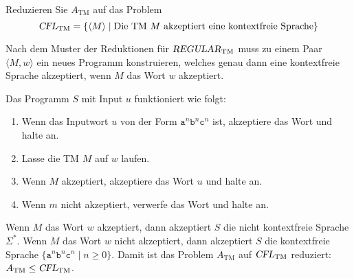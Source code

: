 Reduzieren Sie $A_{\text{TM}}$ auf das Problem
\[
\textsl{CFL}_{\text{TM}}
=
\{
\langle M\rangle
\mid
\text{Die TM $M$ akzeptiert eine kontextfreie Sprache}
\}
\]

\begin{loesung}
Nach dem Muster der Reduktionen für $\textsl{REGULAR}_{\text{TM}}$
muss zu einem Paar $\langle M,w\rangle$ ein neues Programm konstruieren,
welches genau dann eine kontextfreie Sprache akzeptiert, wenn 
$M$ das Wort $w$ akzeptiert.

Das Programm $S$ mit Input $u$ funktioniert wie folgt:
\begin{enumerate}
\item
Wenn das Inputwort $u$ von der Form
$\texttt{a}^n\texttt{b}^n\texttt{c}^n$
ist, akzeptiere das Wort und halte an.
\item 
Lasse die TM $M$ auf $w$ laufen.
\item
Wenn $M$ akzeptiert, akzeptiere das Wort $u$ und halte an.
\item
Wenn $m$ nicht akzeptiert, verwerfe das Wort und halte an.
\end{enumerate}
Wenn $M$ das Wort $w$ akzeptiert, dann akzeptiert $S$ die nicht
kontextfreie Sprache $\Sigma^*$.
Wenn $M$ das Wort $w$ nicht akzeptiert, dann akzeptiert $S$ die
kontextfreie Sprache $\{\texttt{a}^n\texttt{b}^n\texttt{c}^n \mid n\ge 0\}$.
Damit ist das Problem $A_{\text{TM}}$ auf $\textsl{CFL}_{\text{TM}}$
reduziert: $A_{\text{TM}}\le \textsl{CFL}_{\text{TM}}$.
\end{loesung}
